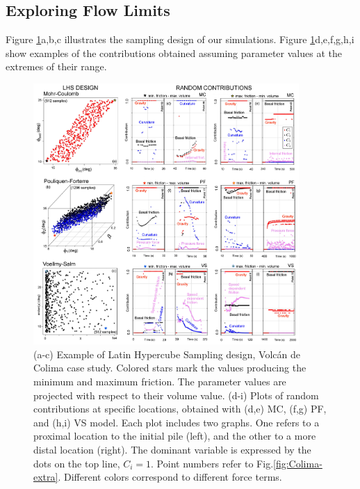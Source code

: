 \documentclass{article}
\begin{document}
\subsection{Exploring Flow Limits} \label{lhs_des_colima}
Figure \ref{fig:Colima-CC1}a,b,c illustrates the sampling design of our simulations. Figure \ref{fig:Colima-CC1}d,e,f,g,h,i show examples of the contributions obtained assuming parameter values at the extremes of their range.
\begin{figure}[H]
         \centering
        \includegraphics[width=0.90\textwidth]{SensitivityFigure.jpg}
        \caption{(a-c) Example of Latin Hypercube Sampling design, Volc{\'a}n de Colima case study. Colored stars mark the values producing the minimum and maximum friction. The parameter values are projected with respect to their volume value. (d-i) Plots of random contributions at specific locations, obtained with (d,e) MC, (f,g) PF, and (h,i) VS model. Each plot includes two graphs. One refers to a proximal location to the initial pile (left), and the other to a more distal location (right). The dominant variable is expressed by the dots on the top line, $C_i=1$. Point numbers refer to Fig.\ref{fig:Colima-extra}. Different colors correspond to different force terms.}
        \label{fig:Colima-CC1}
\end{figure}
\end{document}
